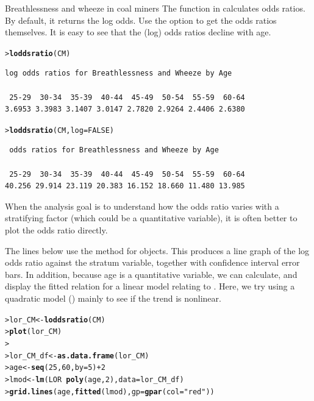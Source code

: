\documentclass[10pt,krantz2]{krantz}\usepackage[]{graphicx}\usepackage[]{color}
\makeatletter
\newcommand{\hlnum}[1]{\textcolor[rgb]{0.686,0.059,0.569}{#1}}%
\newcommand{\hlstr}[1]{\textcolor[rgb]{0.192,0.494,0.8}{#1}}%
\newcommand{\hlopt}[1]{\textcolor[rgb]{0,0,0}{#1}}%
\newcommand{\hlstd}[1]{\textcolor[rgb]{0.345,0.345,0.345}{#1}}%
\newcommand{\hlkwb}[1]{\textcolor[rgb]{0.69,0.353,0.396}{#1}}%
\newcommand{\hlkwc}[1]{\textcolor[rgb]{0.333,0.667,0.333}{#1}}%
\newcommand{\hlkwd}[1]{\textcolor[rgb]{0.737,0.353,0.396}{\textbf{#1}}}%
\newenvironment{kframe}{%
 \def\at@end@of@kframe{}%
 \ifinner\ifhmode%
  \def\at@end@of@kframe{\end{minipage}}%
  \begin{minipage}{\columnwidth}%
 \fi\fi%
 \def\FrameCommand##1{\hskip\@totalleftmargin \hskip-\fboxsep
 \colorbox{shadecolor}{##1}\hskip-\fboxsep
     \hskip-\linewidth \hskip-\@totalleftmargin \hskip\columnwidth}%
 \MakeFramed {\advance\hsize-\width
   \@totalleftmargin\z@ \linewidth\hsize
   \@setminipage}}%
 {\par\unskip\endMakeFramed%
 \at@end@of@kframe}
\newenvironment{knitrout}{}{} %
\renewenvironment{knitrout}{\small\renewcommand{\baselinestretch}{.85}}{} %
\makeatother
\begin{document}
\begin{Example}[wheeze1]{Breathlessness and wheeze in coal miners}
The  function in  calculates odds ratios.  
By default, it returns the
log odds.  Use the option  to get the odds ratios
themselves.  It is easy to see that the (log) odds ratios decline
with age.
\begin{knitrout}
\color{fgcolor}\begin{kframe}
\begin{alltt}
\hlstd{> }\hlkwd{loddsratio}\hlstd{(CM)}
\end{alltt}
\begin{verbatim}
log odds ratios for Breathlessness and Wheeze by Age 

 25-29  30-34  35-39  40-44  45-49  50-54  55-59  60-64 
3.6953 3.3983 3.1407 3.0147 2.7820 2.9264 2.4406 2.6380 
\end{verbatim}
\begin{alltt}
\hlstd{> }\hlkwd{loddsratio}\hlstd{(CM,} \hlkwc{log} \hlstd{=} \hlnum{FALSE}\hlstd{)}
\end{alltt}
\begin{verbatim}
 odds ratios for Breathlessness and Wheeze by Age 

 25-29  30-34  35-39  40-44  45-49  50-54  55-59  60-64 
40.256 29.914 23.119 20.383 16.152 18.660 11.480 13.985 
\end{verbatim}
\end{kframe}
\end{knitrout}
When the analysis goal is to understand how the odds ratio varies
with a stratifying factor (which could be a quantitative variable),
it is often better to plot the odds ratio directly.

The lines below
use the  method for  objects.
This produces a line graph of the log odds ratio against the
stratum variable, together with confidence interval error bars.
In addition, because age is a quantitative variable, we can
calculate, and display the fitted relation for a linear model
relating  to .  Here, we try using a
quadratic model () mainly to see if the
trend is nonlinear.
\begin{knitrout}
\color{fgcolor}\begin{kframe}
\begin{alltt}
\hlstd{> }\hlstd{lor_CM} \hlkwb{<-} \hlkwd{loddsratio}\hlstd{(CM)}
\hlstd{> }\hlkwd{plot}\hlstd{(lor_CM)}
\hlstd{> }
\hlstd{> }\hlstd{lor_CM_df} \hlkwb{<-} \hlkwd{as.data.frame}\hlstd{(lor_CM)}
\hlstd{> }\hlstd{age} \hlkwb{<-} \hlkwd{seq}\hlstd{(}\hlnum{25}\hlstd{,} \hlnum{60}\hlstd{,} \hlkwc{by} \hlstd{=} \hlnum{5}\hlstd{)} \hlopt{+} \hlnum{2}
\hlstd{> }\hlstd{lmod} \hlkwb{<-} \hlkwd{lm}\hlstd{(LOR} \hlopt{~} \hlkwd{poly}\hlstd{(age,} \hlnum{2}\hlstd{),} \hlkwc{data} \hlstd{= lor_CM_df)}
\hlstd{> }\hlkwd{grid.lines}\hlstd{(age,} \hlkwd{fitted}\hlstd{(lmod),} \hlkwc{gp} \hlstd{=} \hlkwd{gpar}\hlstd{(}\hlkwc{col} \hlstd{=} \hlstr{"red"}\hlstd{))}
\end{alltt}
\end{kframe}\begin{figure}[!htbp]


\end{figure}
\end{knitrout}
\end{Example}
\end{document}
